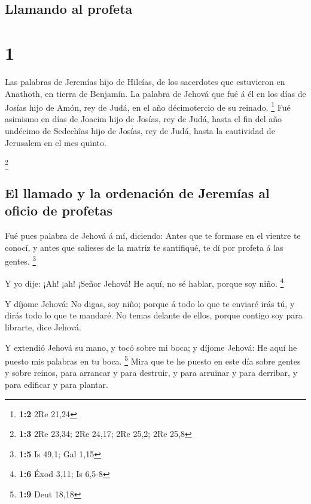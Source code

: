 \hypertarget{llamando-al-profeta}{%
\subsection{Llamando al profeta}\label{llamando-al-profeta}}

\hypertarget{section}{%
\section{1}\label{section}}

 Las palabras de Jeremías hijo de Hilcías, de los sacerdotes
que estuvieron en Anathoth, en tierra de Benjamín.  La
palabra de Jehová que fué á él en los días de Josías hijo de Amón, rey
de Judá, en el año décimotercio de su reinado. \footnote{\textbf{1:2}
  2Re 21,24}  Fué asimismo en días de Joacim hijo de Josías,
rey de Judá, hasta el fin del año undécimo de Sedechîas hijo de Josías,
rey de Judá, hasta la cautividad de Jerusalem en el mes quinto.

\footnote{\textbf{1:3} 2Re 23,34; 2Re 24,17; 2Re 25,2; 2Re 25,8}

\hypertarget{el-llamado-y-la-ordenaciuxf3n-de-jeremuxedas-al-oficio-de-profetas}{%
\subsection{El llamado y la ordenación de Jeremías al oficio de
profetas}\label{el-llamado-y-la-ordenaciuxf3n-de-jeremuxedas-al-oficio-de-profetas}}

 Fué pues palabra de Jehová á mí, diciendo: 
Antes que te formase en el vientre te conocí, y antes que salieses de la
matriz te santifiqué, te dí por profeta á las gentes. \footnote{\textbf{1:5}
  Is 49,1; Gal 1,15}

 Y yo dije: ¡Ah! ¡ah! ¡Señor Jehová! He aquí, no sé hablar,
porque soy niño. \footnote{\textbf{1:6} Éxod 3,11; Is 6,5-8}

 Y díjome Jehová: No digas, soy niño; porque á todo lo que
te enviaré irás tú, y dirás todo lo que te mandaré.  No
temas delante de ellos, porque contigo soy para librarte, dice Jehová.

 Y extendió Jehová su mano, y tocó sobre mi boca; y díjome
Jehová: He aquí he puesto mis palabras en tu boca. \footnote{\textbf{1:9}
  Deut 18,18}  Mira que te he puesto en este día sobre
gentes y sobre reinos, para arrancar y para destruir, y para arruinar y
para derribar, y para edificar y para plantar.

